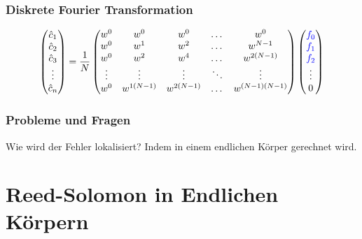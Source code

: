 \documentclass[11pt,aspectratio=169]{beamer}
\begin{document}
	\begin{frame}
	\frametitle{Diskrete Fourier Transformation}
	\[
	\begin{pmatrix}
		\hat{c}_1 \\\hat{c}_2 \\\hat{c}_3 \\ \vdots \\\hat{c}_n
	\end{pmatrix}
	= \frac{1}{N}
	\begin{pmatrix}
		w^0 & w^0   & w^0  & \dots  &w^0     \\
		w^0 & w^1   &w^2   & \dots  &w^{N-1}     \\ 
		w^0 & w^2   &w^4   & \dots  &w^{2(N-1)}  \\ 
		\vdots   & \vdots     &\vdots     &\ddots  &\vdots       \\
		w^0 & w^{1(N-1)}&w^{2(N-1)}& \dots  &w^{(N-1)(N-1)}  \\ 
	\end{pmatrix}
	\begin{pmatrix}
		\textcolor{blue}{f_0}  	\\
		\textcolor{blue}{f_1}	\\
		\textcolor{blue}{f_2}	\\	 
 		\vdots  \\
	 	0  \\ 
	\end{pmatrix}
	\]
	\end{frame}

	\begin{frame}
		\frametitle{Probleme und Fragen}
		
			Wie wird der Fehler lokalisiert?
			\newline
			Indem in einem endlichen Körper gerechnet wird.
		
	\end{frame}	



\section{Reed-Solomon in Endlichen Körpern}	
\end{document}
